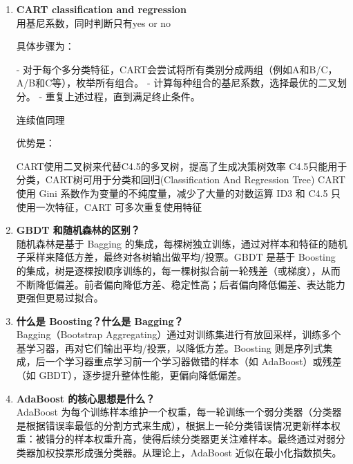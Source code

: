 \documentclass{article}
\begin{document}
\begin{enumerate}
4、缺失值的处理

特征缺失时的划分  
   当某个样本在某特征上的取值缺失时，C4.5不会简单地丢弃该样本，而是采用“概率分配”的方式。具体做法是：
   - 根据该特征已知取值的样本分布，计算每个分支的概率。
   - 将缺失特征的样本按照这些概率，分配到各个分支，并在后续统计时采用加权方式。

缺失值对信息增益计算的影响  
   在计算信息增益或信息增益比时，C4.5会：
   - 只用特征值已知的样本来计算信息增益。
   - 计算时，对缺失特征的样本进行加权处理，使其对总信息增益的影响按概率分配。

\item \textbf{CART classification and regression}\\

用基尼系数，同时判断只有yes or no 

具体步骤为：

   - 对于每个多分类特征，CART会尝试将所有类别分成两组（例如A和B/C，A/B和C等），枚举所有组合。
   - 计算每种组合的基尼系数，选择最优的二叉划分。
   - 重复上述过程，直到满足终止条件。

连续值同理

优势是：

CART使用二叉树来代替C4.5的多叉树，提高了生成决策树效率
C4.5只能用于分类，CART树可用于分类和回归(Classification And Regression Tree)
CART 使用 Gini 系数作为变量的不纯度量，减少了大量的对数运算
ID3 和 C4.5 只使用一次特征，CART 可多次重复使用特征

\item \textbf{GBDT 和随机森林的区别？}\\
随机森林是基于 Bagging 的集成，每棵树独立训练，通过对样本和特征的随机子采样来降低方差，最终对各树输出做平均/投票。GBDT 是基于 Boosting 的集成，树是逐棵按顺序训练的，每一棵树拟合前一轮残差（或梯度），从而不断降低偏差。前者偏向降低方差、稳定性高；后者偏向降低偏差、表达能力更强但更易过拟合。

\item \textbf{什么是 Boosting？什么是 Bagging？}\\
Bagging（Bootstrap Aggregating）通过对训练集进行有放回采样，训练多个基学习器，再对它们输出平均/投票，以降低方差。Boosting 则是序列式集成，后一个学习器重点学习前一个学习器做错的样本（如 AdaBoost）或残差（如 GBDT），逐步提升整体性能，更偏向降低偏差。

\item \textbf{AdaBoost 的核心思想是什么？}\\
AdaBoost 为每个训练样本维护一个权重，每一轮训练一个弱分类器（分类器是根据错误率最低的分割方式来生成），根据上一轮分类错误情况更新样本权重：被错分的样本权重升高，使得后续分类器更关注难样本。最终通过对弱分类器加权投票形成强分类器。从理论上，AdaBoost 近似在最小化指数损失。


\end{enumerate}
\end{document}
